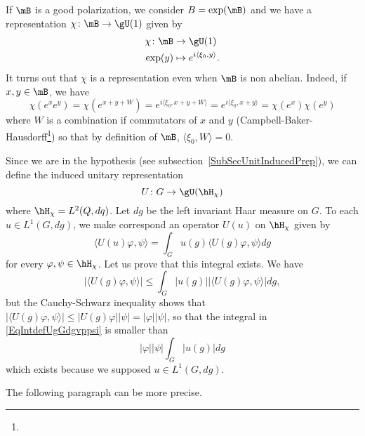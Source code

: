 If $\mB$ is a good polarization, we consider $B=\exp(\mB)$ and we have a representation $\chi\colon \mB\to \gU(1)$ given by
\begin{equation}
	\begin{aligned}
		\chi\colon \mB&\to \gU(1) \\
		\exp(y)&\mapsto  e^{i\langle \xi_0, y\rangle }.
	\end{aligned}
\end{equation}
It turns out that $\chi$ is a representation even when $\mB$ is non abelian. Indeed, if $x,y\in\mB$, we have
\begin{equation}
	\chi( e^{x} e^{y})=\chi( e^{x+y+W})= e^{i\langle \xi_0, x+y+W\rangle }= e^{i\langle \xi_0, x+y\rangle }= \chi( e^{x})\chi( e^{y})
\end{equation}
where $W$ is a combination if commutators of $x$ and $y$ (Campbell-Baker-Hausdorff\footnote{}) so that by definition of $\mB$, $\langle \xi_0, W\rangle =0$.

Since we are in the hypothesis (see subsection~\ref{SubSecUnitInducedPrep}), we can define the induced unitary representation
\begin{equation}
	U\colon G\to \gU(\hH_{\chi})
\end{equation}
where $\hH_{\chi}=L^2(Q,dq)$. Let $dg$ be the left invariant Haar measure on $G$.  To each $u\in L^1(G,dg)$, we make correspond an operator $U(u)$ on $\hH_{\chi}$ given by
\begin{equation}	\label{EqDefUudansHh}
	\langle U(u)\varphi, \psi\rangle =\int_Gu(g)\langle U(g)\varphi, \psi\rangle dg
\end{equation}
for every $\varphi,\psi\in\hH_{\chi}$. Let us prove that this integral exists. We have
\begin{equation}	\label{EqIntdefUgGdgvppsi}
		| \langle U(g)\varphi, \psi\rangle  |\leq\int_G| u(g) | |\langle U(g)\varphi, \psi\rangle  |dg,
\end{equation}
but the Cauchy-Schwarz inequality shows that $| \langle U(g)\varphi, \psi\rangle  |\leq| U(g)\varphi | |\psi |=| \varphi | |\psi |$, so that the integral in \eqref{EqIntdefUgGdgvppsi} is smaller than
\begin{equation}
	| \varphi | | \psi |  \int_G| u(g) |dg
\end{equation}
which exists because we supposed $u\in L^1(G,dg)$.

\begin{probleme}
	The following paragraph can be more precise.
\end{probleme}

